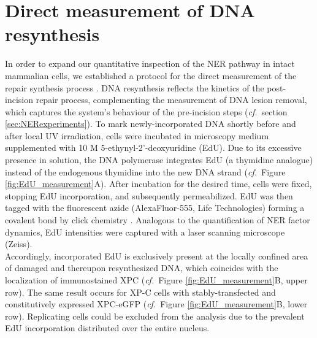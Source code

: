 \section{Direct measurement of DNA resynthesis}
\label{Subsec:EdUmeasurement}

In order to expand our quantitative inspection of the NER pathway in intact mammalian cells, we established a protocol for the direct measurement of the repair synthesis process \cite{Verbruggen2014}. DNA resynthesis reflects the kinetics of the post-incision repair process, complementing the measurement of DNA lesion removal, which captures the system's behaviour of the pre-incision steps (\textit{cf.}\ section \ref{sec:NERexperiments}). To mark newly-incorporated DNA shortly before and after local UV irradiation, cells were incubated in microscopy medium supplemented with 10 \textmu M 5-ethynyl-2'-deoxyuridine (EdU). Due to its excessive presence in solution, the DNA polymerase integrates EdU (a thymidine analogue) instead of the endogenous thymidine into the new DNA strand (\textit{cf.}\ Figure \ref{fig:EdU_measurement}A). After incubation for the desired time, cells were fixed, stopping EdU incorporation, and subsequently permeabilized. EdU was then tagged with the fluorescent azide (AlexaFluor-555, Life Technologies) forming a covalent bond by click chemistry \cite{Limsirichaikul2009}. Analogous to the quantification of NER factor dynamics, EdU intensities were captured with a laser scanning microscope (Zeiss).\\
Accordingly, incorporated EdU is exclusively present at the locally confined area of damaged and thereupon resynthesized DNA, which coincides with the localization of immunostained XPC (\textit{cf.}\ Figure \ref{fig:EdU_measurement}B, upper row). The same result occurs for XP-C cells with stably-transfected and constitutively expressed XPC-eGFP (\textit{cf.}\ Figure \ref{fig:EdU_measurement}B, lower row). Replicating cells could be excluded from the analysis due to the prevalent EdU incorporation distributed over the entire nucleus. 
\label{sec_DNAresynthesis}  







